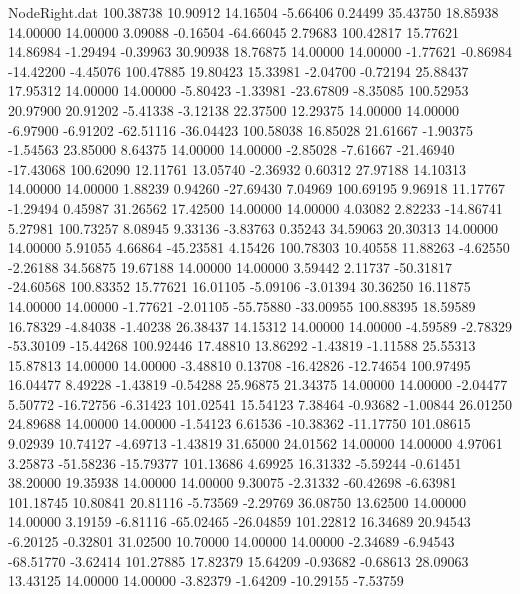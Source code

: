 \begin{filecontents}{NodeRight.dat}
 100.38738   10.90912   14.16504    -5.66406    0.24499   35.43750   18.85938   14.00000   14.00000    3.09088   -0.16504  -64.66045    2.79683
 100.42817   15.77621   14.86984    -1.29494   -0.39963   30.90938   18.76875   14.00000   14.00000   -1.77621   -0.86984  -14.42200   -4.45076
 100.47885   19.80423   15.33981    -2.04700   -0.72194   25.88437   17.95312   14.00000   14.00000   -5.80423   -1.33981  -23.67809   -8.35085
 100.52953   20.97900   20.91202    -5.41338   -3.12138   22.37500   12.29375   14.00000   14.00000   -6.97900   -6.91202  -62.51116  -36.04423
 100.58038   16.85028   21.61667    -1.90375   -1.54563   23.85000    8.64375   14.00000   14.00000   -2.85028   -7.61667  -21.46940  -17.43068
 100.62090   12.11761   13.05740    -2.36932    0.60312   27.97188   14.10313   14.00000   14.00000    1.88239    0.94260  -27.69430    7.04969
 100.69195    9.96918   11.17767    -1.29494    0.45987   31.26562   17.42500   14.00000   14.00000    4.03082    2.82233  -14.86741    5.27981
 100.73257    8.08945    9.33136    -3.83763    0.35243   34.59063   20.30313   14.00000   14.00000    5.91055    4.66864  -45.23581    4.15426
 100.78303   10.40558   11.88263    -4.62550   -2.26188   34.56875   19.67188   14.00000   14.00000    3.59442    2.11737  -50.31817  -24.60568
 100.83352   15.77621   16.01105    -5.09106   -3.01394   30.36250   16.11875   14.00000   14.00000   -1.77621   -2.01105  -55.75880  -33.00955
 100.88395   18.59589   16.78329    -4.84038   -1.40238   26.38437   14.15312   14.00000   14.00000   -4.59589   -2.78329  -53.30109  -15.44268
 100.92446   17.48810   13.86292    -1.43819   -1.11588   25.55313   15.87813   14.00000   14.00000   -3.48810    0.13708  -16.42826  -12.74654
 100.97495   16.04477    8.49228    -1.43819   -0.54288   25.96875   21.34375   14.00000   14.00000   -2.04477    5.50772  -16.72756   -6.31423
 101.02541   15.54123    7.38464    -0.93682   -1.00844   26.01250   24.89688   14.00000   14.00000   -1.54123    6.61536  -10.38362  -11.17750
 101.08615    9.02939   10.74127    -4.69713   -1.43819   31.65000   24.01562   14.00000   14.00000    4.97061    3.25873  -51.58236  -15.79377
 101.13686    4.69925   16.31332    -5.59244   -0.61451   38.20000   19.35938   14.00000   14.00000    9.30075   -2.31332  -60.42698   -6.63981
 101.18745   10.80841   20.81116    -5.73569   -2.29769   36.08750   13.62500   14.00000   14.00000    3.19159   -6.81116  -65.02465  -26.04859
 101.22812   16.34689   20.94543    -6.20125   -0.32801   31.02500   10.70000   14.00000   14.00000   -2.34689   -6.94543  -68.51770   -3.62414
 101.27885   17.82379   15.64209    -0.93682   -0.68613   28.09063   13.43125   14.00000   14.00000   -3.82379   -1.64209  -10.29155   -7.53759

\end{filecontents}
